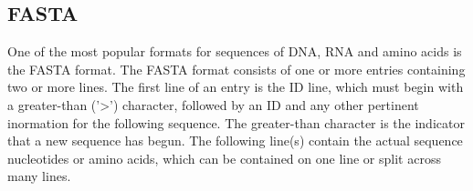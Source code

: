 \subsection{FASTA}
One of the most popular formats for sequences of DNA, RNA and amino
acids is the FASTA format. The FASTA format consists of one or more
entries containing two or more lines. The first line of an entry is
the ID line, which must begin with a greater-than ('>') character,
followed by an ID and any other pertinent inormation for the following
sequence. The greater-than character is the indicator that a new
sequence has begun. The following line(s) contain the actual sequence
nucleotides or amino acids, which can be contained on one line or
split across many lines.
